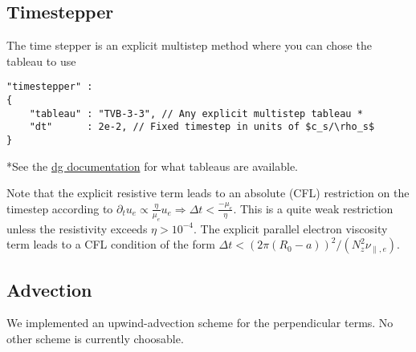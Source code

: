\subsection{Timestepper}
The time stepper is an explicit multistep method where you can chose the
tableau to use
\begin{verbatim}
"timestepper" :
{
    "tableau" : "TVB-3-3", // Any explicit multistep tableau *
    "dt"      : 2e-2, // Fixed timestep in units of $c_s/\rho_s$
}
\end{verbatim}
*See the \href{https://feltor-dev.github.io/doc/dg/html/structdg_1_1_explicit_multistep.html}{dg documentation} for what tableaus are available.

Note that the explicit resistive term leads to an absolute (CFL) restriction
on the timestep according to $\partial_t u_e \propto \frac{\eta}{\mu_e} u_e \Rightarrow \Delta t < \frac{-\mu_e}{\eta}$. This is a quite weak restriction unless the resistivity exceeds $\eta > 10^{-4}$.
The explicit parallel electron viscosity term leads to a CFL condition of the
form $\Delta t < (2\pi (R_0 - a))^2/(N_z^2 \nu_{\parallel,e})$.

%

\subsection{Advection}
We implemented an upwind-advection scheme for the perpendicular terms.
No other scheme is currently choosable.
